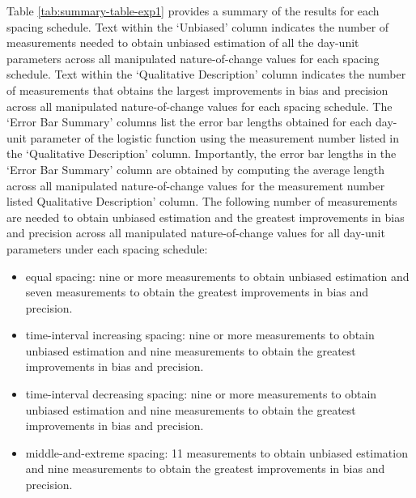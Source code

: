 \documentclass[
12pt, %
twoside,
english]{guelphthesis}
\theoremstyle{definition}
\theoremstyle{definition}
\theoremstyle{definition}
\theoremstyle{definition}
\theoremstyle{remark}
\begin{document}
Table \ref{tab:summary-table-exp1} provides a summary of the results for each spacing schedule. Text within the `Unbiased' column indicates the number of measurements needed to obtain unbiased estimation of all the day-unit parameters across all manipulated nature-of-change values for each spacing schedule. Text within the `Qualitative Description' column indicates the number of measurements that obtains the largest improvements in bias and precision across all manipulated nature-of-change values for each spacing schedule. The `Error Bar Summary' columns list the error bar lengths obtained for each day-unit parameter of the logistic function using the measurement number listed in the `Qualitative Description' column. Importantly, the error bar lengths in the `Error Bar Summary' column are obtained by computing the average length across all manipulated nature-of-change values for the measurement number listed Qualitative Description' column. The following number of measurements are needed to obtain unbiased estimation and the greatest improvements in bias and precision across all manipulated nature-of-change values for all day-unit parameters under each spacing schedule:
\begin{itemize}
\tightlist
\item
  equal spacing: nine or more measurements to obtain unbiased estimation and seven measurements to obtain the greatest improvements in bias and precision.
\item
  time-interval increasing spacing: nine or more measurements to obtain unbiased estimation and nine measurements to obtain the greatest improvements in bias and precision.
\item
  time-interval decreasing spacing: nine or more measurements to obtain unbiased estimation and nine measurements to obtain the greatest improvements in bias and precision.
\item
  middle-and-extreme spacing: 11 measurements to obtain unbiased estimation and nine measurements to obtain the greatest improvements in bias and precision.
\end{itemize}
\end{document}
